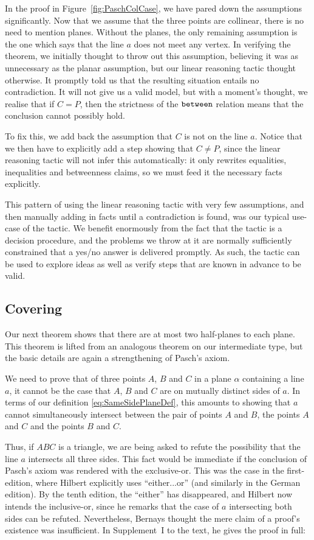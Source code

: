 In the proof in Figure~\ref{fig:PaschColCase}, we have pared down the assumptions significantly. Now that we assume that the three points are collinear, there is no need to mention planes. Without the planes, the only remaining assumption is the one which says that the line $a$ does not meet any vertex. In verifying the theorem, we initially thought to throw out this assumption, believing it was as unnecessary as the planar assumption, but our linear reasoning tactic thought otherwise. It promptly told us that the resulting situation entails no contradiction. It will not give us a valid model, but with a moment's thought, we realise that if $C = P$, then the strictness of the $\texttt{between}$ relation means that the conclusion cannot possibly hold.

To fix this, we add back the assumption that $C$ is not on the line $a$. Notice that we then have to explicitly add a step showing that $C \neq P$, since the linear reasoning tactic will not infer this automatically: it only rewrites equalities, inequalities and betweenness claims, so we must feed it the necessary facts explicitly.

This pattern of using the linear reasoning tactic with very few assumptions, and then manually adding in facts until a contradiction is found, was our typical use-case of the tactic. We benefit enormously from the fact that the tactic is a decision procedure, and the problems we throw at it are normally sufficiently constrained that a yes/no answer is delivered promptly. As such, the tactic can be used to explore ideas as well as verify steps that are known in advance to be valid.

\subsection{Covering}
Our next theorem shows that there are at most two half-planes to each plane. This theorem is lifted from an analogous theorem on our intermediate type, but the basic details are again a strengthening of Pasch's axiom.

We need to prove that of three points $A$, $B$ and $C$ in a plane $\alpha$ containing a line $a$, it cannot be the case that $A$, $B$ and $C$ are on mutually distinct sides of $a$. In terms of our definition \eqref{eq:SameSidePlaneDef}, this amounts to showing that $a$ cannot simultaneously intersect between the pair of points $A$ and $B$, the points $A$ and $C$ and the points $B$ and $C$. 

\label{sec:PaschInclusiveOr}Thus, if $ABC$ is a triangle, we are being asked to refute the possibility that the line $a$ intersects all three sides. This fact would be immediate if the conclusion of Pasch's axiom was rendered with the exclusive-or. This was the case in the first-edition, where Hilbert explicitly uses ``either...or'' (and similarly in the German edition). By the tenth edition, the ``either'' has disappeared, and Hilbert now intends the inclusive-or, since he remarks that the case of $a$ intersecting both sides can be refuted. Nevertheless, Bernays thought the mere claim of a proof's existence was insufficient. In Supplement~I to the text, he gives the proof in full:

